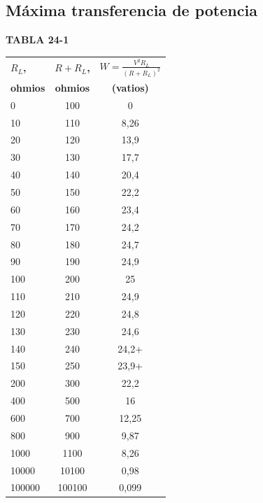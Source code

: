\documentclass{article}
\begin{document}
\noindent \begin{parbox}[t]{0.45\textwidth}{
    \subsection*{Máxima transferencia de potencia}
    \vspace{0.5cm}
    \textbf{TABLA 24-1}
    
    \centering
    \begin{tabular}{l S[table-format=6.0] S[table-format=5.2]}
        \toprule
        \textbf{$R_L$,} & \textbf{$R+R_L$,} & {\textbf{$W = \frac{V^2 R_L}{(R+R_L)^2}$}} \\
        \textbf{ohmios} & \textbf{ohmios} & \textbf{(vatios)} \\
         & 100 & 0 \\
        10 & 110 & 8,26 \\
        20 & 120 & 13,9 \\
        30 & 130 & 17,7 \\
        40 & 140 & 20,4 \\
        50 & 150 & 22,2 \\
        60 & 160 & 23,4 \\
        70 & 170 & 24,2 \\
        80 & 180 & 24,7 \\
        90 & 190 & 24,9 \\
        100 & 200 & 25 \\
        110 & 210 & 24,9 \\
        120 & 220 & 24,8 \\
        130 & 230 & 24,6 \\
        140 & 240 & {24,2+} \\
        150 & 250 & {23,9+} \\
        200 & 300 & 22,2 \\
        400 & 500 & 16 \\
        600 & 700 & 12,25 \\
        800 & 900 & 9,87 \\
        1000 & 1100 & 8,26 \\
        10000 & 10100 & 0,98 \\
        100000 & 100100 & 0,099 \\
        \bottomrule
    \end{tabular}
    
    \vspace{1cm} %
    
}
\end{parbox}
\end{document}
